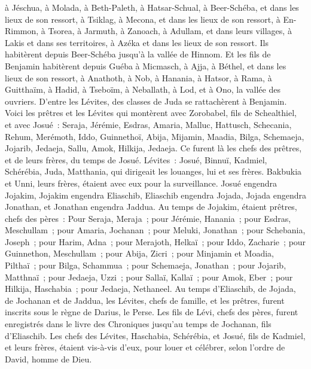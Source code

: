 \begin{multicols}{2}
à Jéschua, à Molada, à Beth-Paleth,
à Hatsar-Schual, à Beer-Schéba, et dans les lieux de son ressort,
à Tsiklag, à Mecona, et dans les lieux de son ressort,
à En-Rimmon, à Tsorea, à Jarmuth,
à Zanoach, à Adullam, et dans leurs villages, à Lakis et dans ses territoires, à Azéka et dans les lieux de son ressort. Ils habitèrent depuis Beer-Schéba jusqu'à la vallée de Hinnom.
Et les fils de Benjamin habitèrent depuis Guéba à Micmasch, à Ajja, à Béthel, et dans les lieux de son ressort,
à Anathoth, à Nob, à Hanania,
à Hatsor, à Rama, à Guitthaïm,
à Hadid, à Tseboïm, à Neballath,
à Lod, et à Ono, la vallée des ouvriers.
D'entre les Lévites, des classes de Juda se rattachèrent à Benjamin.
\VerseOne{}Voici les prêtres et les Lévites qui montèrent avec Zorobabel, fils de Schealthiel, et avec Josué~: Seraja, Jérémie, Esdras,
Amaria, Malluc, Hattusch,
Schecania, Rehum, Merémoth,
Iddo, Guinnethoï, Abija,
Mijamin, Maadia, Bilga,
Schemaeja, Jojarib, Jedaeja,
Sallu, Amok, Hilkija, Jedaeja. Ce furent là les chefs des prêtres, et de leurs frères, du temps de Josué.
Lévites~: Josué, Binnuï, Kadmiel, Schérébia, Juda, Matthania, qui dirigeait les louanges, lui et ses frères.
Bakbukia et Unni, leurs frères, étaient avec eux pour la surveillance.
Josué engendra Jojakim, Jojakim engendra Eliaschib, Eliaschib engendra Jojada,
Jojada engendra Jonathan, et Jonathan engendra Jaddua.
Au temps de Jojakim, étaient prêtres, chefs des pères~: Pour Seraja, Meraja~; pour Jérémie, Hanania~;
pour Esdras, Meschullam~; pour Amaria, Jochanan~;
pour Meluki, Jonathan~; pour Schebania, Joseph~;
pour Harim, Adna~; pour Merajoth, Helkaï~;
pour Iddo, Zacharie~; pour Guinnethon, Meschullam~;
pour Abija, Zicri~; pour Minjamin et Moadia, Pilthaï~;
pour Bilga, Schammua~; pour Schemaeja, Jonathan~;
pour Jojarib, Matthnaï~; pour Jedaeja, Uzzi~;
pour Sallaï, Kallaï~; pour Amok, Eber~;
pour Hilkija, Haschabia~; pour Jedaeja, Nethaneel.
Au temps d'Eliaschib, de Jojada, de Jochanan et de Jaddua, les Lévites, chefs de famille, et les prêtres, furent inscrits sous le règne de Darius, le Perse.
Les fils de Lévi, chefs des pères, furent enregistrés dans le livre des Chroniques jusqu'au temps de Jochanan, fils d'Eliaschib.
Les chefs des Lévites, Haschabia, Schérébia, et Josué, fils de Kadmiel, et leurs frères, étaient vis-à-vis d'eux, pour louer et célébrer, selon l'ordre de David, homme de Dieu.

\end{multicols}
